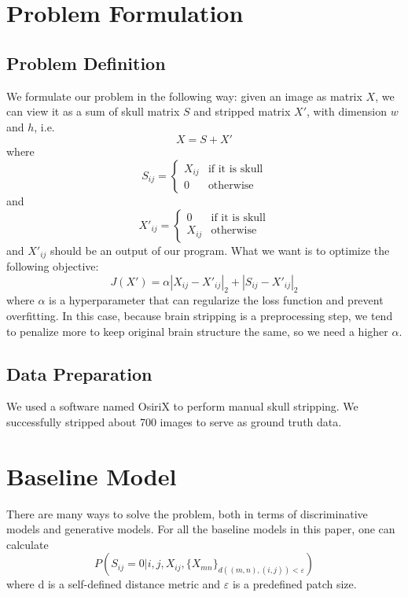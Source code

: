 \documentclass[conference]{IEEEtran}
\begin{document}
\section{Problem Formulation}
\subsection*{Problem Definition}
We formulate our problem in the following way: given an image as matrix $X$, we can view it as a sum of skull matrix $S$ and stripped matrix $X'$, with dimension $w$ and $h$, i.e.
\[
X = S + X'
\]
where
\[
S_{ij} = 
\begin{cases}
X_{ij} &\text{if it is skull} \\
0 &\text{otherwise}
\end{cases}
\]
and 
\[
X'_{ij} = 
\begin{cases}
0 &\text{if it is skull} \\
X_{ij} &\text{otherwise}
\end{cases}
\]
and $X'_{ij}$ should be an output of our program. What we want is to optimize the following objective: 
\begin{equation}
\label{loss}
J(X') = \alpha{|X_{ij} -X'_{ij}|_2} + |S_{ij} - X'_{ij}|_2
\end{equation}
where $\alpha$ is a hyperparameter that can regularize the loss function and prevent overfitting. In this case, because brain stripping is a preprocessing step, we tend to penalize more to keep original brain structure the same, so we need a higher $\alpha$. 

\subsection{Data Preparation}
We used a software named OsiriX to perform manual skull stripping. We successfully stripped about 700 images to serve as ground truth data.


\section{Baseline Model}
There are many ways to solve the problem, both in terms of discriminative models and generative models. For all the baseline models in this paper, one can calculate 
\begin{equation}
\label{prob}
P(S_{ij} = 0 | i, j, X_{ij}, \{X_{mn}\}_{d((m,n), (i, j)) < \varepsilon})
\end{equation}
where d is a self-defined distance metric and $\varepsilon$ is a predefined patch size. 
\end{document}
